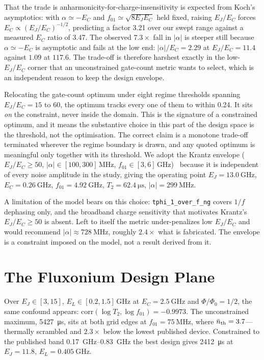 \documentclass[journal]{IEEEtran}
\begin{document}
That the trade is anharmonicity-for-charge-insensitivity is expected from Koch's asymptotics:
with $\alpha \simeq -E_C$ and $f_{01} \simeq \sqrt{8E_JE_C}$ held fixed, raising $E_J/E_C$
forces $E_C \propto (E_J/E_C)^{-1/2}$, predicting a factor 3.21 over our swept range against a
measured $E_C$ ratio of 3.47. The observed $7.3\times$ fall in $|\alpha|$ is steeper still
because $\alpha \simeq -E_C$ is asymptotic and fails at the low end: $|\alpha|/E_C = 2.29$ at
$E_J/E_C = 11.4$ against $1.09$ at $117.6$. The trade-off is therefore harshest exactly in the
low-$E_J/E_C$ corner that an unconstrained gate-count metric wants to select, which is an
independent reason to keep the design envelope.

Relocating the gate-count optimum under eight regime thresholds spanning $E_J/E_C = 15$ to
60, the optimum tracks every one of them to within 0.24. It sits \emph{on} the constraint,
never inside the domain. This is the signature of a constrained optimum, and it means the
substantive choice in this part of the design space is the threshold, not the optimisation. The correct claim is a monotone trade-off terminated wherever the
regime boundary is drawn, and any quoted optimum is meaningful only together with its
threshold. We adopt the Krantz envelope ($E_J/E_C \ge 50$, $|\alpha| \in
[100,300]$\,MHz, $f_{01} \in [3,6]$\,GHz)~\cite{krantz2019} because it is independent of every
noise amplitude in the study, giving the operating point $E_J = \SI{13.0}{\giga\hertz}$,
$E_C = \SI{0.26}{\giga\hertz}$, $f_{01} = \SI{4.92}{\giga\hertz}$,
$T_2 = \SI{62.4}{\micro\second}$, $|\alpha| = \SI{299}{\mega\hertz}$.

A limitation of the model bears on this choice: \texttt{tphi\_1\_over\_f\_ng} covers $1/f$
dephasing only, and the broadband charge sensitivity that motivates Krantz's
$E_J/E_C \ge 50$ is absent. Left to itself the metric under-penalizes low $E_J/E_C$ and would
recommend $|\alpha| \approx \SI{728}{\mega\hertz}$, roughly $2.4\times$ what is fabricated.
The envelope is a constraint imposed on the model, not a result derived from it.

\section{The Fluxonium Design Plane}

Over $E_J \in [3,15]$, $E_L \in [0.2,1.5]$\,GHz at $E_C = \SI{2.5}{\giga\hertz}$ and
$\Phi/\Phi_0 = 1/2$, the same confound appears: $\mathrm{corr}(\log T_2, \log f_{01}) =
-0.9973$. The unconstrained maximum, \SI{5427}{\micro\second}, sits at both grid edges at
$f_{01} = \SI{75}{\mega\hertz}$, where $\bar n_{\rm th} = 3.7$---thermally scrambled and
$2.3\times$ below the lowest published device. Constrained to the published band
\SIrange{0.17}{0.83}{\giga\hertz} the best design gives \SI{2412}{\micro\second} at
$E_J = 11.8$, $E_L = \SI{0.405}{\giga\hertz}$.
\end{document}
